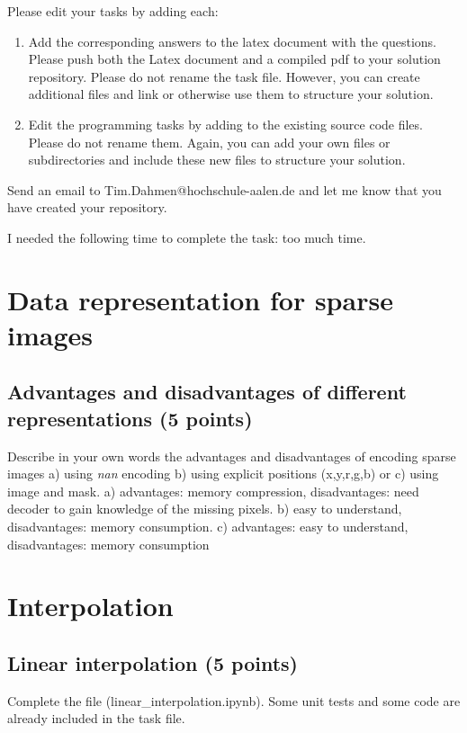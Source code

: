 Please edit your tasks by adding each:

\begin{enumerate}
\item Add the corresponding answers to the latex document with the questions. Please push both the Latex document and a compiled pdf to your solution repository. Please do not rename the task file. However, you can create additional files and link or otherwise use them to structure your solution. 
\item Edit the programming tasks by adding to the existing source code files. Please do not rename them. Again, you can add your own files or subdirectories and include these new files to structure your solution. 
\end{enumerate}

Send an email to Tim.Dahmen@hochschule-aalen.de and let me know that you have created your repository. 

I needed the following time to complete the task: too much time.

\section{Data representation for sparse images}

\subsection{Advantages and disadvantages of different representations (5 points)}

Describe in your own words the advantages and disadvantages of encoding sparse images a) using \textit{nan} encoding b) using explicit positions (x,y,r,g,b) or c) using image and mask.
a) advantages: memory compression, disadvantages: need decoder to gain knowledge of the missing pixels. b) easy to understand, disadvantages: memory consumption. c) advantages: easy to understand, disadvantages: memory consumption

\section{Interpolation}

\subsection{Linear interpolation (5 points)}

Complete the file (linear\_interpolation.ipynb). Some unit tests and some code are already included in the task file.

